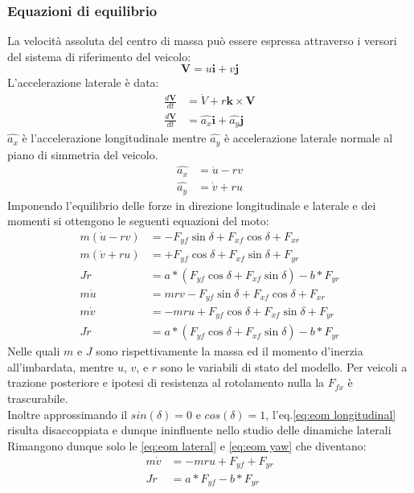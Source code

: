 \subsubsection{Equazioni di equilibrio}
La velocità assoluta del centro di massa può essere espressa attraverso i versori del sistema di riferimento del veicolo:\\
\begin{equation}
\textbf{V} = u\textbf{i}+v\textbf{j}
\end{equation}
L'accelerazione laterale è data:\\
\begin{equation}
\begin{split}
\frac{d\textbf{V}}{dt} & = \textbf{$\dot V$}+r\textbf{k}\times\textbf{V}\\
\frac{d\textbf{V}}{dt} & = \hat{a_x}\textbf{i}+\hat{a_y}\textbf{j}
\end{split}
\end{equation}
$\hat{a_x}$ è l'accelerazione longitudinale mentre $\hat{a_y}$ è accelerazione laterale normale al piano di simmetria del veicolo.\\
\begin{align}
\hat{a_x} & = \dot u - rv\\
\hat{a_y} & = \dot v + ru
\end{align}
Imponendo l'equilibrio delle forze in direzione longitudinale e laterale e dei momenti si ottengono le seguenti equazioni del moto:
\begin{align}
m(\dot u- rv) & = -F_{yf} \sin \delta+F_{xf} \cos \delta+F_{xr}\\
m(\dot v+ ru) & = +F_{yf} \cos \delta+F_{xf} \sin \delta+F_{yr}\\
J\dot r & = a*(F_{yf} \cos \delta+F_{xf} \sin \delta)-b*F_{yr}\\[3mm]
m\dot u & =  mrv-F_{yf} \sin \delta+F_{xf} \cos \delta+F_{xr} \label{eq:eom longitudinal}\\
m\dot v & = -mru+F_{yf} \cos \delta+F_{xf} \sin \delta+F_{yr} \label{eq:eom lateral}\\
J\dot r & = a*(F_{yf} \cos \delta+F_{xf} \sin\delta)-b*F_{yr} \label{eq:eom yaw}
\end{align}
Nelle quali $m$ e $J$ sono rispettivamente la massa ed il momento d'inerzia all'imbardata, mentre $u$, $v$, e $r$ sono le variabili di stato del modello.
Per veicoli a trazione posteriore e ipotesi di resistenza al rotolamento nulla la $F_{fx}$ è trascurabile.\\
Inoltre approssimando il $sin(\delta)=0$ e $cos(\delta)=1$, l'eq.\ref{eq:eom longitudinal} 
risulta disaccoppiata e dunque ininfluente nello studio delle dinamiche laterali\\
Rimangono dunque solo le \ref{eq:eom lateral} e \ref{eq:eom yaw} che diventano:
\begin{align}
m\dot v & = -mru+F_{yf}+F_{yr}\label{eq:eom lateral 2}\\
J\dot r & = a*F_{yf}-b*F_{yr}\label{eq:eom yaw 2}
\end{align}


